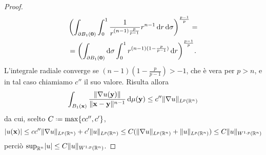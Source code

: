 \begin{proof}
\begin{multline}
        \biggl(\int_{\boundary B_1(\vec 0)}\int_0^1 \frac1{r^{(n-1)\frac{p}{p-1}}}r^{n-1}\,\dd r\,\dd\sigma\biggr)^\frac{p-1}{p}=\\=
        \biggl(\int_{\boundary B_1(\vec 0)}\dd\sigma\int_0^1 r^{(n-1)(1-\frac{p}{p-1})}\,\dd r\biggr)^\frac{p-1}{p}.
    \end{multline}
    L'integrale radiale converge se $(n-1)(1-\frac{p}{p-1})>-1$, che è vera per $p>n$, e in tal caso chiamiamo $c''$ il suo valore.
    Risulta allora
    \begin{equation}
        \int_{B_1(\vec x)} \frac{\norm{\grad u(\vec y)}}{\norm{\vec x-\vec y}^{n-1}}\,\dd\mu(\vec y)\le
        c''\norm{\grad u}_{\leb[p]{\R^n}}
    \end{equation}
    da cui, scelto $C\defeq\max\{cc'',c'\}$,
    \begin{equation}
        \abs{u(\vec x)}\le
        cc''\norm{\grad u}_{\leb[p]{\R^n}}+c'\norm{u}_{\leb[p]{\R^n}}\le
        C(\norm{\grad u}_{\leb[p]{\R^n}}+\norm{u}_{\leb[p]{\R^n}})\le
        C\norm{u}_{\sobW[1,p]{\R^n}}
    \end{equation}
    perciò $\sup_{\R^n}\abs{u}\le C\norm{u}_{\sobW[1,p]{\R^n}}$.


\end{proof}
